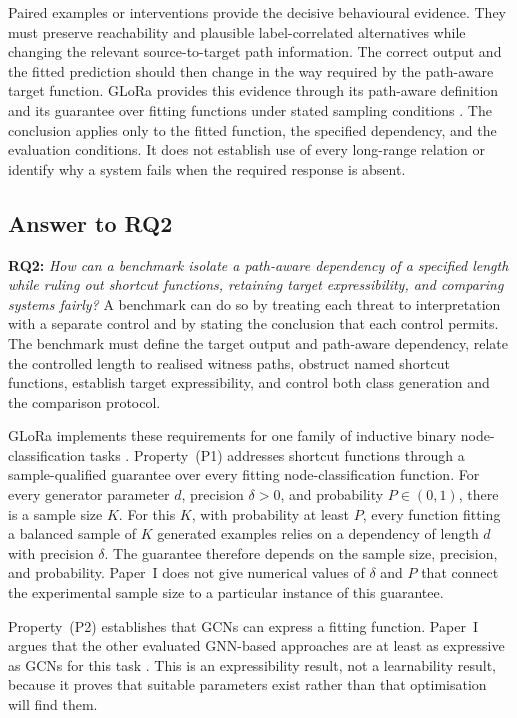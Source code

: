 Paired examples or interventions provide the decisive behavioural evidence.
They must preserve reachability and plausible label-correlated alternatives while changing the relevant source-to-target path information.
The correct output and the fitted prediction should then change in the way required by the path-aware target function.
GLoRa provides this evidence through its path-aware definition and its guarantee over fitting functions under stated sampling conditions \cite{zhou2025glora}.
The conclusion applies only to the fitted function, the specified dependency, and the evaluation conditions.
It does not establish use of every long-range relation or identify why a system fails when the required response is absent.

\subsection{Answer to RQ2}

\noindent\textbf{RQ2:} \emph{How can a benchmark isolate a path-aware dependency of a specified length while ruling out shortcut functions, retaining target expressibility, and comparing systems fairly?}
A benchmark can do so by treating each threat to interpretation with a separate control and by stating the conclusion that each control permits.
The benchmark must define the target output and path-aware dependency, relate the controlled length to realised witness paths, obstruct named shortcut functions, establish target expressibility, and control both class generation and the comparison protocol.

GLoRa implements these requirements for one family of inductive binary node-classification tasks \cite{zhou2025glora}.
Property~(P1) addresses shortcut functions through a sample-qualified guarantee over every fitting node-classification function.
For every generator parameter $d$, precision $\delta>0$, and probability $P\in(0,1)$, there is a sample size $K$.
For this $K$, with probability at least $P$, every function fitting a balanced sample of $K$ generated examples relies on a dependency of length $d$ with precision $\delta$.
The guarantee therefore depends on the sample size, precision, and probability.
Paper~I does not give numerical values of $\delta$ and $P$ that connect the experimental sample size to a particular instance of this guarantee.

Property~(P2) establishes that GCNs can express a fitting function.
Paper~I argues that the other evaluated GNN-based approaches are at least as expressive as GCNs for this task \cite{barcelo2020logical,zhou2025glora}.
This is an expressibility result, not a learnability result, because it proves that suitable parameters exist rather than that optimisation will find them.

